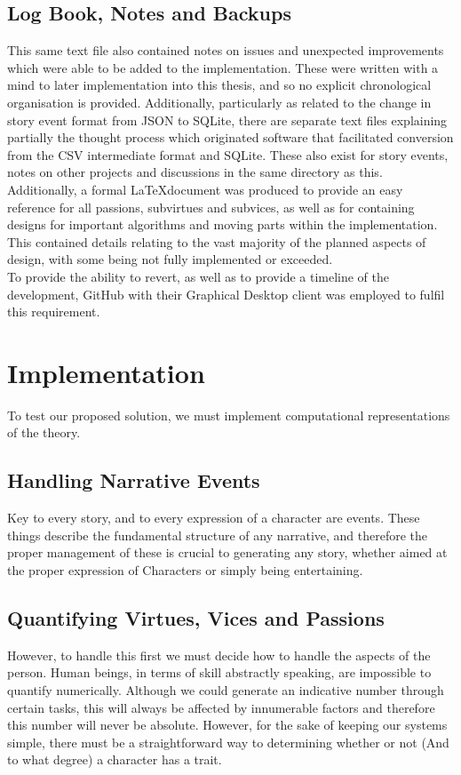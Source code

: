 \documentclass[11pt]{article}
\begin{document}
\subsection{Log Book, Notes and Backups} 
This same text file also contained notes on issues and unexpected improvements which were able to be added to the implementation. These were written with a mind to later implementation into this thesis, and so no explicit chronological organisation is provided. Additionally, particularly as related to the change in story event format from JSON to SQLite, there are separate text files explaining partially the thought process which originated software that facilitated conversion from the CSV intermediate format and SQLite. These also exist for story events, notes on other projects and discussions in the same directory as this. \\
Additionally, a formal \LaTeX document was produced to provide an easy reference for all passions, subvirtues and subvices, as well as for containing designs for important algorithms and moving parts within the implementation. This contained details relating to the vast majority of the planned aspects of design, with some being not fully implemented or exceeded. \\
To provide the ability to revert, as well as to provide a timeline of the development, GitHub with their Graphical Desktop client was employed to fulfil this requirement. 


\section{Implementation}
To test our proposed solution, we must implement computational representations of the theory. 

\subsection{Handling Narrative Events}
Key to every story, and to every expression of a character are events. These things describe the fundamental structure of any narrative, and therefore the proper management of these is crucial to generating any story, whether aimed at the proper expression of Characters or simply being entertaining. 

\subsection{Quantifying Virtues, Vices and Passions}
However, to handle this first we must decide how to handle the aspects of the person. Human beings, in terms of skill abstractly speaking, are impossible to quantify numerically. Although we could generate an indicative number through certain tasks, this will always be affected by innumerable factors and therefore this number will never be absolute. However, for the sake of keeping our systems simple, there must be a straightforward way to determining whether or not (And to what degree) a character has a trait. \\
\end{document}

